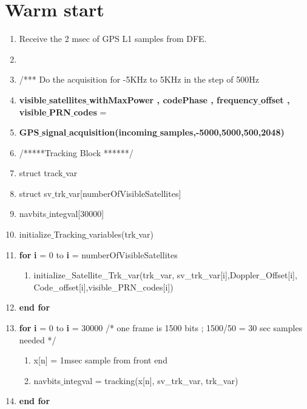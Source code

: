 \documentclass[journal,10pt,onecolumn]{article}
\begin{document}
\section{Warm start}
\begin{enumerate}
    \item Receive the 2 msec of GPS L1 samples from DFE.
    \item []
    \item[] /*** Do the acquisition for -5KHz to 5KHz in the step of 500Hz
    \item \textbf{visible$\_$satellites$\_$withMaxPower , codePhase , frequency$\_$offset , visible$\_$PRN$\_$codes}  =  
    \item[] \textbf{GPS$\_$signal$\_$acquisition(incoming$\_$samples,-5000,5000,500,2048)} 
    \item[] /*****Tracking Block ******/ 
    \item struct track$\_$var
    \item struct sv$\_$trk$\_$var[numberOfVisibleSatellites]
    \item navbits$\_$integval[30000]
    \item initialize$\_$Tracking$\_$variables(trk$\_$var)
    \item \textbf{for} \textbf{i} = 0 to \textbf{i} = numberOfVisibleSatellites
    \begin{enumerate}
        \item[] initialize\_Satellite\_Trk\_var(trk\_var, sv\_trk\_var[i],Doppler\_Offset[i], Code\_offset[i],visible\_PRN\_codes[i])
    \end{enumerate}
    \item[] \textbf{end for}
    \item \textbf{for} \textbf{i} = 0 to \textbf{i} = 30000 /* one frame is 1500 bits ; 1500/50 = 30 sec samples needed */
    \begin{enumerate}
        \item[] x[n] = 1msec sample from front end 
        \item[] navbits$\_$integval = tracking(x[n], sv\_trk\_var, trk\_var)
    \end{enumerate}
    \item[] \textbf{end for}
\end{enumerate}
\end{document}
